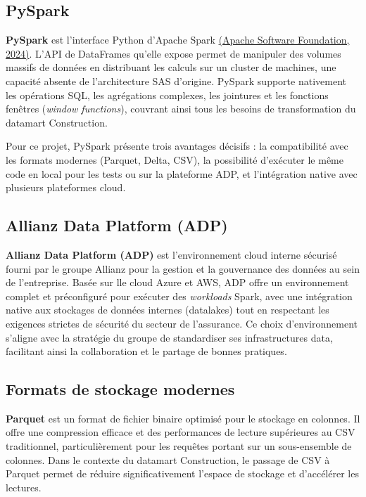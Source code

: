 \subsection{PySpark}

\textbf{PySpark} est l'interface Python d'Apache Spark \hyperlink{ref.apache}{(Apache Software Foundation, 2024)}. L'API de DataFrames qu'elle expose permet de manipuler des volumes massifs de données en distribuant les calculs sur un cluster de machines, une capacité absente de l'architecture SAS d'origine. PySpark supporte nativement les opérations SQL, les agrégations complexes, les jointures et les fonctions fenêtres (\textit{window functions}), couvrant ainsi tous les besoins de transformation du datamart Construction.

Pour ce projet, PySpark présente trois avantages décisifs : la compatibilité avec les formats modernes (Parquet, Delta, CSV), la possibilité d'exécuter le même code en local pour les tests ou sur la plateforme ADP, et l'intégration native avec plusieurs plateformes cloud.

\subsection{Allianz Data Platform (ADP)}

\textbf{Allianz Data Platform (ADP)} est l'environnement cloud interne sécurisé fourni par le groupe Allianz pour la gestion et la gouvernance des données au sein de l'entreprise. Basée sur lle cloud Azure et AWS, ADP offre un environnement complet et préconfiguré pour exécuter des \textit{workloads} Spark, avec une intégration native aux stockages de données internes (datalakes) tout en respectant les exigences strictes de sécurité du secteur de l'assurance. Ce choix d'environnement s'aligne avec la stratégie du groupe de standardiser ses infrastructures data, facilitant ainsi la collaboration et le partage de bonnes pratiques.

\subsection{Formats de stockage modernes}

\textbf{Parquet} est un format de fichier binaire optimisé pour le stockage en colonnes. Il offre une compression efficace et des performances de lecture supérieures au CSV traditionnel, particulièrement pour les requêtes portant sur un sous-ensemble de colonnes. Dans le contexte du datamart Construction, le passage de CSV à Parquet permet de réduire significativement l'espace de stockage et d'accélérer les lectures.

